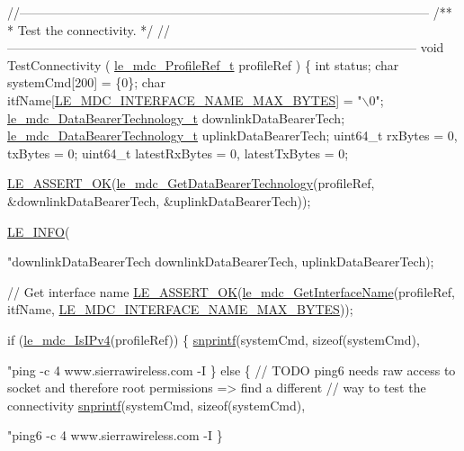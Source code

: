 \begin{DoxyCodeInclude}
\textcolor{comment}{//--------------------------------------------------------------------------------------------------}\textcolor{comment}{}
\textcolor{comment}{/**}
\textcolor{comment}{ * Test the connectivity.}
\textcolor{comment}{ */}
\textcolor{comment}{//--------------------------------------------------------------------------------------------------}
\textcolor{keywordtype}{void} TestConnectivity
(
    \hyperlink{le__mdc__interface_8h_a91074d8f0d88c6645e3085dfadf87011}{le\_mdc\_ProfileRef\_t} profileRef
)
\{
    \textcolor{keywordtype}{int} status;
    \textcolor{keywordtype}{char} systemCmd[200] = \{0\};
    \textcolor{keywordtype}{char} itfName[\hyperlink{le__mdc__interface_8h_a33ebf9afd03f0ffc91a80c32c15afb42}{LE\_MDC\_INTERFACE\_NAME\_MAX\_BYTES}] = \textcolor{stringliteral}{"\(\backslash\)0"};
    \hyperlink{le__mdc__interface_8h_a7a9d8c4b2053b048a53257ed810f527e}{le\_mdc\_DataBearerTechnology\_t} downlinkDataBearerTech;
    \hyperlink{le__mdc__interface_8h_a7a9d8c4b2053b048a53257ed810f527e}{le\_mdc\_DataBearerTechnology\_t} uplinkDataBearerTech;
    uint64\_t rxBytes = 0, txBytes = 0;
    uint64\_t latestRxBytes = 0, latestTxBytes = 0;

    \hyperlink{le__log_8h_a7cd2daa3d4af1de4d29e0eed95187484}{LE\_ASSERT\_OK}(\hyperlink{le__mdc__interface_8h_a1b17bb87b347162013b5ad608cdcda2d}{le\_mdc\_GetDataBearerTechnology}(profileRef,
                                                &downlinkDataBearerTech,
                                                &uplinkDataBearerTech));

    \hyperlink{le__log_8h_a23e6d206faa64f612045d688cdde5808}{LE\_INFO}(\textcolor{stringliteral}{"downlinkDataBearerTech %
            downlinkDataBearerTech, uplinkDataBearerTech);

    \textcolor{comment}{// Get interface name}
    \hyperlink{le__log_8h_a7cd2daa3d4af1de4d29e0eed95187484}{LE\_ASSERT\_OK}(\hyperlink{le__mdc__interface_8h_a4c22a8691d6e6a69270a7ed6ab9974af}{le\_mdc\_GetInterfaceName}(profileRef, itfName, 
      \hyperlink{le__mdc__interface_8h_a33ebf9afd03f0ffc91a80c32c15afb42}{LE\_MDC\_INTERFACE\_NAME\_MAX\_BYTES}));

    \textcolor{keywordflow}{if} (\hyperlink{le__mdc__interface_8h_aa3912e94864a6e5862e07f58b3772cba}{le\_mdc\_IsIPv4}(profileRef))
    \{
        \hyperlink{app_stop_client_8c_a2b6c4b2a795957a91039524b524be480}{snprintf}(systemCmd, \textcolor{keyword}{sizeof}(systemCmd), \textcolor{stringliteral}{"ping -c 4 www.sierrawireless.com -I %
    \}
    \textcolor{keywordflow}{else}
    \{
        \textcolor{comment}{// TODO ping6 needs raw access to socket and therefore root permissions => find a different}
        \textcolor{comment}{// way to test the connectivity}
        \hyperlink{app_stop_client_8c_a2b6c4b2a795957a91039524b524be480}{snprintf}(systemCmd, \textcolor{keyword}{sizeof}(systemCmd), \textcolor{stringliteral}{"ping6 -c 4 www.sierrawireless.com -I %
    \}

}}}
\end{DoxyCodeInclude}
